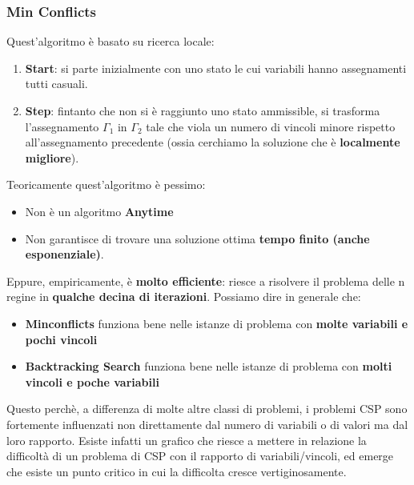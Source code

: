 \subsubsection{Min Conflicts}
Quest'algoritmo è basato su ricerca locale: 
\begin{enumerate}
    \item \textbf{Start}: si parte inizialmente con uno stato le cui variabili hanno assegnamenti tutti casuali.
    \item \textbf{Step}: fintanto che non si è raggiunto uno stato ammissible, si trasforma l'assegnamento $\Gamma_1$ in $\Gamma_2$
    tale che viola un numero di vincoli minore rispetto all'assegnamento precedente (ossia cerchiamo la soluzione che è \textbf{localmente migliore}).
\end{enumerate}
Teoricamente quest'algoritmo è pessimo:
\begin{itemize}
    \item Non è un algoritmo \textbf{Anytime}
    \item Non garantisce di trovare una soluzione ottima \textbf{tempo finito (anche esponenziale)}.
\end{itemize}
Eppure, empiricamente, è \textbf{molto efficiente}: riesce a risolvere il problema delle n regine in \textbf{qualche decina di iterazioni}.
Possiamo dire in generale che:
\begin{itemize}
    \item \textbf{Minconflicts} funziona bene nelle istanze di problema con \textbf{molte variabili e pochi vincoli}
    \item \textbf{Backtracking Search} funziona bene nelle istanze di problema con \textbf{molti vincoli e poche variabili}
\end{itemize}
Questo perchè, a differenza di molte altre classi di problemi, i problemi CSP sono fortemente influenzati non direttamente dal
numero di variabili o di valori ma dal loro rapporto. Esiste infatti un grafico che riesce a mettere in relazione la difficoltà
di un problema di CSP con il rapporto di variabili/vincoli, ed emerge che esiste un punto critico in cui la difficolta cresce vertiginosamente.

